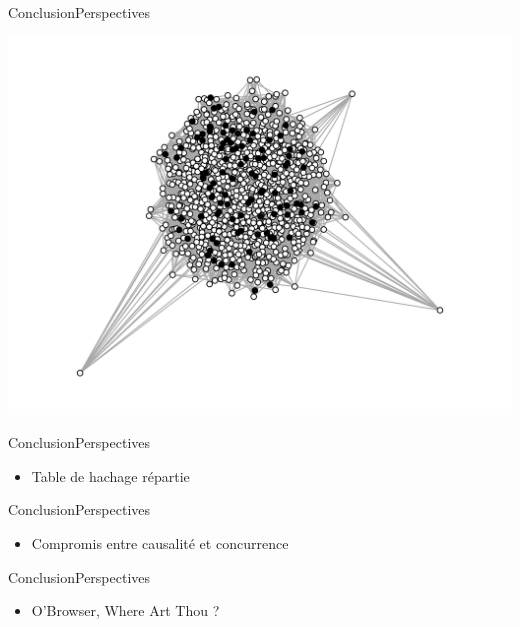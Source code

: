 \begin{frame}{Conclusion}{Perspectives}
\begin{minipage}{0.325\textwidth}
    \includegraphics[width=1.2\textwidth]{img/graphC.png}
  \end{minipage}

\end{frame}

\begin{frame}{Conclusion}{Perspectives}

  \begin{minipage}{0.45\textwidth}
  \begin{itemize}
  \item Table de hachage répartie
  \end{itemize}
  \end{minipage}
  \hfill
  \begin{minipage}{0.45\textwidth}
  \begin{center}
    
  \end{center}
  \end{minipage}

\end{frame}

\begin{frame}{Conclusion}{Perspectives}
  \begin{itemize}
  \item Compromis entre causalité et concurrence
  \end{itemize}
\end{frame}


\begin{frame}{Conclusion}{Perspectives}
  \begin{itemize}
  \item O'Browser, Where Art Thou ?
  \end{itemize}
\end{frame}